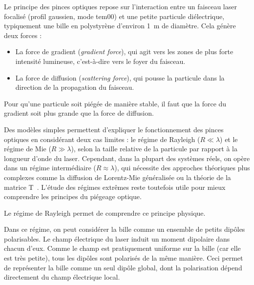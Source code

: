 Le principe des pinces optiques repose sur l'interaction entre un faisceau laser focalisé (profil gaussien, mode \gls{tem00}) et une petite particule diélectrique, typiquement une bille en polystyrène d'environ 1~\textmu m de diamètre. Cela génère deux forces :
\begin{itemize}[label=\textbullet]
    \item La force de gradient (\textit{gradient force}), qui agit vers les zones de plus forte intensité lumineuse, c'est-à-dire vers le foyer du faisceau.
    \item La force de diffusion (\textit{scattering force}), qui pousse la particule dans la direction de la propagation du faisceau.
\end{itemize}
Pour qu'une particule soit piégée de manière stable, il faut que la force du gradient soit plus grande que la force de diffusion.

Des modèles simples permettent d'expliquer le fonctionnement des pinces optiques en considérant deux cas limites : le régime de Rayleigh ($R \ll \lambda$) et le régime de Mie ($R \gg \lambda$), selon la taille relative de la particule par rapport à la longueur d'onde du laser.
Cependant, dans la plupart des systèmes réels, on opère dans un régime intermédiaire ($R \approx \lambda$), qui nécessite des approches théoriques plus complexes comme la diffusion de Lorentz-Mie généralisée ou la théorie de la matrice T~\cite{epflExplanationOpticalTweezers}.
L'étude des régimes extrêmes reste toutefois utile pour mieux comprendre les principes du piégeage optique.

Le régime de Rayleigh permet de comprendre ce principe physique.

Dans ce régime, on peut considérer la bille comme un ensemble de petits dipôles polarisables. Le champ électrique du laser induit un moment dipolaire dans chacun d'eux. Comme le champ est pratiquement uniforme sur la bille (car elle est très petite), tous les dipôles sont polarisés de la même manière. Ceci permet de représenter la bille comme un seul dipôle global, dont la polarisation dépend directement du champ électrique local.

